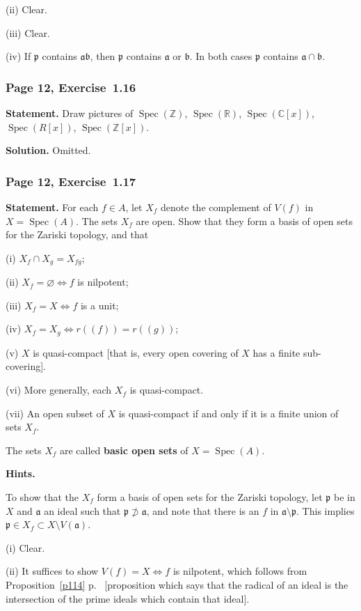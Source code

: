 \documentclass[12pt,letterpaper]{article}%
\newcommand{\mf}{\mathfrak}
\newcommand{\aaa}{\mf a}
\newcommand{\bbb}{\mf b}
\newcommand{\ppp}{\mf p}
\newcommand{\Spec}{\operatorname{Spec}}\newcommand{\Sp}{\operatorname{Spec}}
\newcommand{\nn}{\noindent}
\newcommand{\Z}{\mathbb Z}
\begin{document}
\nn(ii) Clear.

\nn(iii) Clear.

\nn(iv) If $\ppp$ contains $\aaa\bbb$, then $\ppp$ contains $\aaa$ or $\bbb$. In both cases $\ppp$ contains $\aaa\cap\bbb$.

\subsubsection{Page 12, Exercise~1.16}%

\textbf{Statement.} Draw pictures of $\Spec(\Z)$, $\Spec(\mathbb R)$, $\Spec(\mathbb C[x])$, $\Spec(R[x])$, $\Spec(\Z[x])$.

\nn\textbf{Solution.} Omitted.%

\subsubsection{Page 12, Exercise~1.17}\label{ex1.17}%

\textbf{Statement.} For each $f\in A$, let $X_f$ denote the complement of $V(f)$ in $X= \Spec(A)$. The sets $X_f$ are open. Show that they form a basis of open sets for the Zariski topology, and that

\nn(i) $X_f\cap X_g=X_{fg}$;

\nn(ii) $X_f=\varnothing\iff f$ is nilpotent;

\nn(iii) $X_f=X\iff f$ is a unit; 

\nn(iv) $X_f=X_g\iff r((f))=r((g))$;

\nn(v) $X$ is quasi-compact [that is, every open covering of $X$ has a finite sub-covering].

\nn(vi) More generally, each $X_f$ is quasi-compact.

\nn(vii) An open subset of $X$ is quasi-compact if and only if it is a finite union of
sets $X_f$.

\nn The sets $X_f$ are called \textbf{basic open sets} of $X=\Spec(A)$.

\nn\textbf{Hints.} 

\nn To show that the $X_f$ form a basis of open sets for the Zariski topology, let $\ppp$ be in $X$ and $\aaa$ an ideal such that $\ppp\not\supset\aaa$, and note that there is an $f$ in $\aaa\setminus\ppp$. This implies $\ppp\in X_f\subset X\setminus V(\aaa)$. 

\nn(i) Clear.

\nn(ii) It suffices to show $V(f)=X\iff f$ is nilpotent, which follows from Proposition~\ref{p114} p.~\pageref{p114} [proposition which says that the radical of an ideal is the intersection of the prime ideals which contain that ideal].
\end{document}
